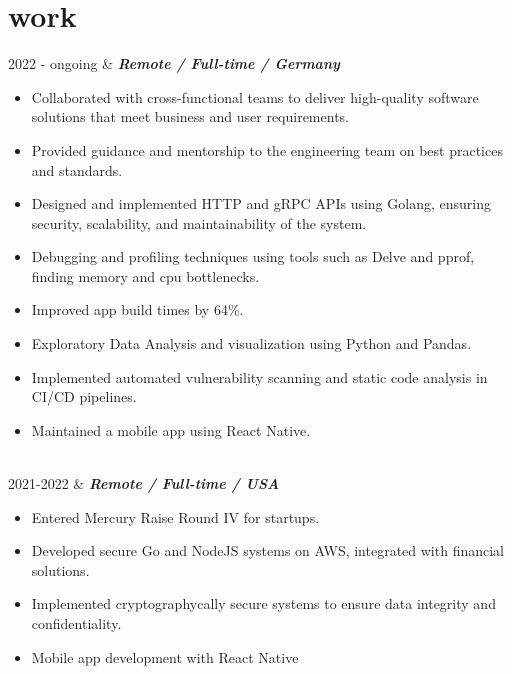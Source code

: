 \documentclass[]{cv-mauri}
\begin{document}
\section*{work}
\begin{tabularcv}
	2022 - ongoing   &   
					\textbf{\textit{Remote / Full-time / Germany}}

			\begin{itemize}
				\item Collaborated with cross-functional teams to deliver high-quality software solutions that meet business and user requirements.
				\item Provided guidance and mentorship to the engineering team on best practices and standards.
				\item Designed and implemented HTTP and gRPC APIs using Golang, ensuring security, scalability, and maintainability of the system.
				\item Debugging and profiling techniques using tools such as Delve and pprof, finding memory and cpu bottlenecks. 
				\item Improved app build times by 64\%.
				\item Exploratory Data Analysis and visualization using Python and Pandas.
				\item Implemented automated vulnerability scanning and static code analysis in CI/CD pipelines.
				\item Maintained a mobile app using React Native.
			\end{itemize}
					\\[\vspacepar]

	2021-2022   &   
					\textbf{\textit{Remote / Full-time / USA}}

			\begin{itemize}
				\item Entered Mercury Raise Round IV for startups.
				\item Developed secure Go and NodeJS systems on AWS, integrated with financial solutions.
				\item Implemented cryptographycally secure systems to ensure data integrity and confidentiality.
				\item Mobile app development with React Native
			\end{itemize}
					\\[\vspacepar]
	

\end{tabularcv}
\end{document}
